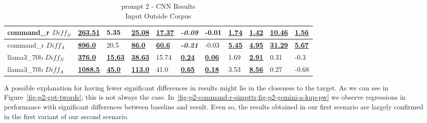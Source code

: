 \documentclass[11pt]{article}
\begin{document}
\begin{table}[ht!]
{\begin{tabular}{lllllllllll}
            command\_r $Diff_N$  & \textbf{\underline{263.51}}  & 5.35                       & \textbf{\underline{25.08}}  & \textbf{\underline{17.37}} & \textbf{\textit{-0.09}}   & -0.01                     & \textbf{\underline{1.74}} & \textbf{\underline{1.42}} & \textbf{\underline{10.46}} & \textbf{\underline{1.56}} \\ \midrule
            command\_r $Diff_A$  & \textbf{\underline{896.0}}   & 20.5                       & \textbf{\underline{86.0}}   & \textbf{\underline{60.6}}  & \textbf{\textit{-0.21}}   & -0.03                     & \textbf{\underline{5.45}} & \textbf{\underline{4.95}} & \textbf{\underline{31.29}} & \textbf{\underline{5.67}} \\ \midrule
            llama3\_70b $Diff_N$ & \textbf{\underline{376.0}}   & \textbf{\underline{15.63}} & \textbf{\underline{38.63}}  & 15.74                      & \textbf{\underline{0.24}} & \textbf{\underline{0.06}} & 1.69                      & \textbf{\underline{2.91}} & 0.31                       & -0.3                      \\ \midrule
            llama3\_70b $Diff_A$ & \textbf{\underline{1088.5}}  & \textbf{\underline{45.0}}  & \textbf{\underline{113.0}}  & 41.0                       & \textbf{\underline{0.65}} & \textbf{\underline{0.18}} & 3.53                      & \textbf{\underline{8.56}} & 0.27                       & -0.68                     \\ \bottomrule
        \end{tabular}%
    }
    \caption{prompt 2 - CNN Results\\Input Outside Corpus}\label{table-prompt-2-cnn-dailymail} %
\end{table}

A possible explanation for having fewer significant differences in results might
lie in the closeness to the target.
As we can see in Figure~\ref{fig-p2-gpt-twords}, this is not always the case.
In~\cref{fig-p2-command-r-simpttr,fig-p2-gemini-a-kup-pw} we observe regressions
in performance with significant differences between baseline and result.
Even so, the results obtained in our first scenario are largely confirmed in the
first variant of our second scenario.
\end{document}
